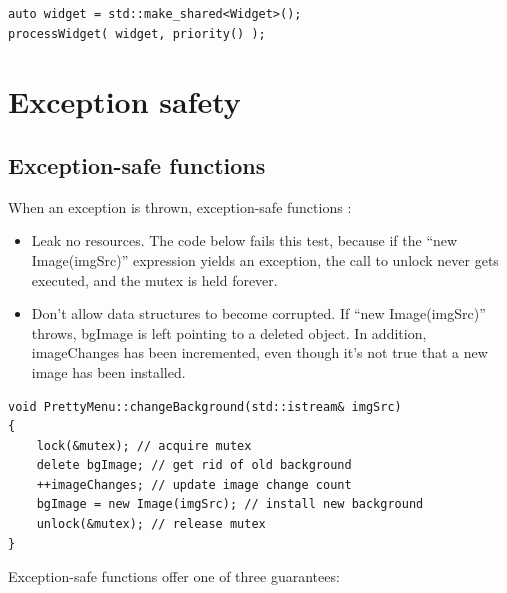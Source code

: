 \documentclass[a4paper,12pt,notitlepage]{article}
\begin{document}
\begin{verbatim}
auto widget = std::make_shared<Widget>();
processWidget( widget, priority() );
\end{verbatim}


\section{Exception safety}


\subsection{Exception-safe functions}

When an exception is thrown, exception-safe functions \cite{Meyers_eff}:

\begin{itemize}
\item Leak no resources. The code below fails this test, because if the “new Image(imgSrc)” expression
  yields an exception, the call to unlock never gets executed, and the mutex is held forever.

\item Don't allow data structures to become corrupted. If “new Image(imgSrc)” throws, bgImage is left
  pointing to a deleted object. In addition, imageChanges has been incremented, even though it's not
  true that a new image has been installed.
\end{itemize}

\begin{verbatim}
void PrettyMenu::changeBackground(std::istream& imgSrc)
{
    lock(&mutex); // acquire mutex
    delete bgImage; // get rid of old background
    ++imageChanges; // update image change count
    bgImage = new Image(imgSrc); // install new background
    unlock(&mutex); // release mutex
}
\end{verbatim}

Exception-safe functions offer one of three guarantees:
\end{document}
